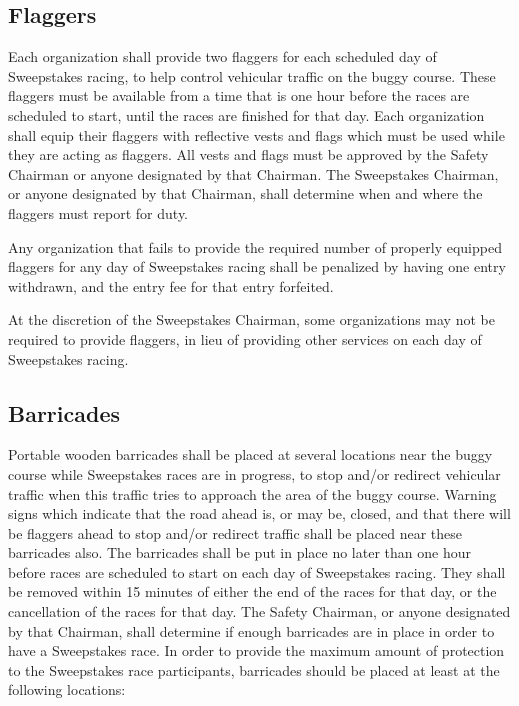 \subsection{Flaggers}

	Each organization shall provide two flaggers for each scheduled day of
	Sweepstakes racing, to help control vehicular traffic on the buggy course.
	These flaggers must be available from a time that is one hour before the races
	are scheduled to start, until the races are finished for that day. Each
	organization shall equip their flaggers with reflective vests and flags which
	must be used while they are acting as flaggers. All vests and flags must be
	approved by the Safety Chairman or anyone designated by that Chairman. The
	Sweepstakes Chairman, or anyone designated by that Chairman, shall determine
	when and where the flaggers must report for duty.

	Any organization that fails to provide the required number of properly equipped
	flaggers for any day of Sweepstakes racing shall be penalized by having one
	entry withdrawn, and the entry fee for that entry forfeited.

	At the discretion of the Sweepstakes Chairman, some organizations may not be
	required to provide flaggers, in lieu of providing other services on each day
	of Sweepstakes racing.

\subsection{Barricades}

	Portable wooden barricades shall be placed at several locations near the buggy
	course while Sweepstakes races are in progress, to stop and/or redirect
	vehicular traffic when this traffic tries to approach the area of the buggy
	course. Warning signs which indicate that the road ahead is, or may be, closed,
	and that there will be flaggers ahead to stop and/or redirect traffic shall be
	placed near these barricades also. The barricades shall be put in place no
	later than one hour before races are scheduled to start on each day of
	Sweepstakes racing. They shall be removed within 15 minutes of either the end
	of the races for that day, or the cancellation of the races for that day. The
	Safety Chairman, or anyone designated by that Chairman, shall determine if
	enough barricades are in place in order to have a Sweepstakes race. In order to
	provide the maximum amount of protection to the Sweepstakes race participants,
	barricades should be placed at least at the following locations:


